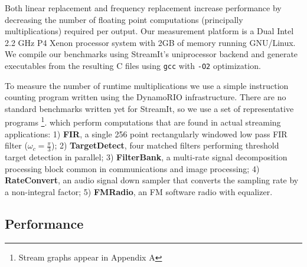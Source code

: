 Both linear replacement and frequency replacement increase performance by 
decreasing the number of floating point computations (principally multiplications) required per output.
Our measurement platform is a Dual Intel 2.2 GHz P4 Xenon processor system 
with 2GB of memory running GNU/Linux. We compile our benchmarks using StreamIt's uniprocessor backend
and generate executables from the resulting C files using {\tt gcc} with {\tt -O2} optimization.

To measure the number of runtime multiplications we use a simple instruction counting 
program written using the DynamoRIO\cite{dynamo99} infrastructure. 
There are no standard benchmarks written yet for StreamIt, so we use
a set of representative programs
\footnote{Stream graphs appear in Appendix A}.
which perform computations that 
are found in actual streaming applications: 1) {\bf FIR}, a single 256
point rectangularly windowed low pass FIR filter
($\omega_c=\frac{\pi}{3}$); 2) {\bf TargetDetect}, four matched
filters performing threshold target detection in parallel; 3) {\bf
FilterBank}, a multi-rate signal decomposition processing block common
in communications and image processing; 4) {\bf RateConvert}, an audio
signal down sampler that converts the sampling rate by a non-integral
factor; 5) {\bf FMRadio}, an FM software radio with equalizer.

\subsection{Performance}




